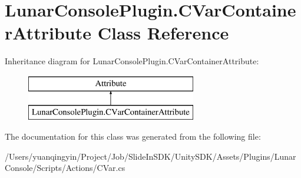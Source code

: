 \hypertarget{class_lunar_console_plugin_1_1_c_var_container_attribute}{}\section{Lunar\+Console\+Plugin.\+C\+Var\+Container\+Attribute Class Reference}
\label{class_lunar_console_plugin_1_1_c_var_container_attribute}
Inheritance diagram for Lunar\+Console\+Plugin.\+C\+Var\+Container\+Attribute\+:\begin{figure}[H]
\begin{center}
\leavevmode
\includegraphics[height=2.000000cm]{class_lunar_console_plugin_1_1_c_var_container_attribute}
\end{center}
\end{figure}


The documentation for this class was generated from the following file\+:\begin{DoxyCompactItemize}
\item 
/\+Users/yuanqingyin/\+Project/\+Job/\+Slide\+In\+S\+D\+K/\+Unity\+S\+D\+K/\+Assets/\+Plugins/\+Lunar\+Console/\+Scripts/\+Actions/C\+Var.\+cs\end{DoxyCompactItemize}
